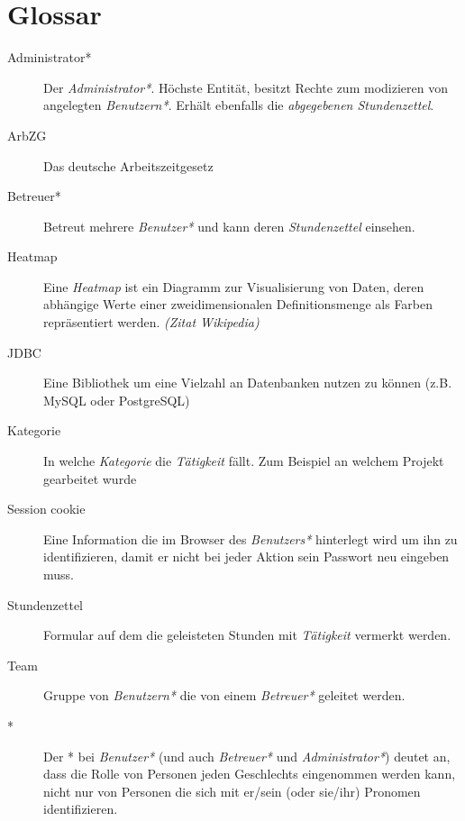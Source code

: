 \section{Glossar}
\begin{description}
	\item[Administrator*] Der \emph{Administrator*}. Höchste Entität, besitzt Rechte zum modizieren von angelegten \emph{Benutzern*}.
	               Erhält ebenfalls die \emph{abgegebenen Stundenzettel}.

	\item[ArbZG] Das deutsche Arbeitszeitgesetz

	\item[Betreuer*] Betreut mehrere \emph{Benutzer*} und kann deren \emph{Stundenzettel} einsehen.

	\item[Heatmap] Eine \emph{Heatmap} ist ein Diagramm zur Visualisierung von Daten, deren abhängige Werte einer zweidimensionalen Definitionsmenge als Farben repräsentiert werden.  \emph{(Zitat Wikipedia)}

	\item[JDBC] Eine Bibliothek um eine Vielzahl an Datenbanken nutzen zu können (z.B. MySQL oder PostgreSQL)

	\item[Kategorie] In welche \emph{Kategorie} die \emph{Tätigkeit} fällt. Zum Beispiel an welchem Projekt gearbeitet wurde

	\item[Session cookie] Eine Information die im Browser des \emph{Benutzers*} hinterlegt wird um ihn zu identifizieren, damit er nicht bei jeder Aktion sein Passwort neu eingeben muss.

	\item[Stundenzettel] Formular auf dem die geleisteten Stunden mit \emph{Tätigkeit} vermerkt werden.

	\item[Team] Gruppe von \emph{Benutzern*} die von einem \emph{Betreuer*} geleitet werden.

	\item[*] Der * bei \emph{Benutzer*} (und auch \emph{Betreuer*} und \emph{Administrator*}) deutet an, dass die Rolle von Personen jeden Geschlechts eingenommen werden kann, nicht nur von Personen die sich mit er/sein (oder sie/ihr) Pronomen identifizieren.

\end{description}
